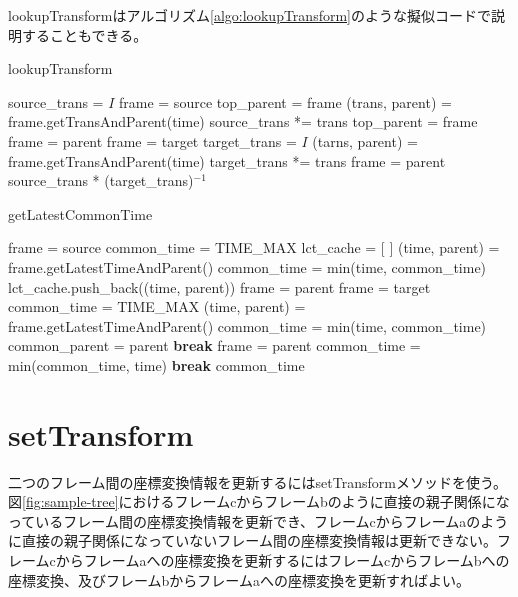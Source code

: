 \documentclass[a4paper]{jreport}	%
\begin{document}
lookupTransformはアルゴリズム\ref{algo:lookupTransform}のような擬似コードで説明することもできる。

\begin{algorithm}
\caption{lookupTransform} \label{algo:lookupTransform}
\begin{algorithmic}[1]
	 
	 
	\EndIf
	\State source\_trans = $I$ 
	\State frame = source
	\State top\_parent = frame
	\State (trans, parent) = frame.getTransAndParent(time) 
	\State source\_trans *= trans
	\State top\_parent = frame
	\State frame = parent
	\EndWhile
	\State frame = target
	\State target\_trans = $I$
	\State (tarns, parent) = frame.getTransAndParent(time)
	\State target\_trans *= trans
	\State frame = parent
	\EndWhile
	\State \Return source\_trans * (target\_trans)$^{-1}$
	\EndFunction
\end{algorithmic}
\end{algorithm}


\begin{algorithm}
\caption{getLatestCommonTime}
\begin{algorithmic}[1]
	 
	\State frame = source
	\State common\_time = TIME\_MAX
	\State lct\_cache = [ ] 
	\State (time, parent) = frame.getLatestTimeAndParent()
	\State common\_time = min(time, common\_time)
	\State lct\_cache.push\_back((time, parent))
	\State frame = parent
	\EndWhile
	\State frame = target
	\State common\_time = TIME\_MAX
	\State (time, parent) = frame.getLatestTimeAndParent()
	\State common\_time = min(time, common\_time)
	\State common\_parent = parent
	\State \textbf{break}
	\EndIf
	\State frame = parent
	\EndWhile
	\State common\_time = min(common\_time, time)
	\State \textbf{break}
	\EndIf
	\EndFor
	\State \Return common\_time
	\EndFunction
\end{algorithmic}
\end{algorithm}


\section{setTransform}
二つのフレーム間の座標変換情報を更新するにはsetTransformメソッドを使う。図\ref{fig:sample-tree}におけるフレームcからフレームbのように直接の親子関係になっているフレーム間の座標変換情報を更新でき、フレームcからフレームaのように直接の親子関係になっていないフレーム間の座標変換情報は更新できない。フレームcからフレームaへの座標変換を更新するにはフレームcからフレームbへの座標変換、及びフレームbからフレームaへの座標変換を更新すればよい。
\end{document}
